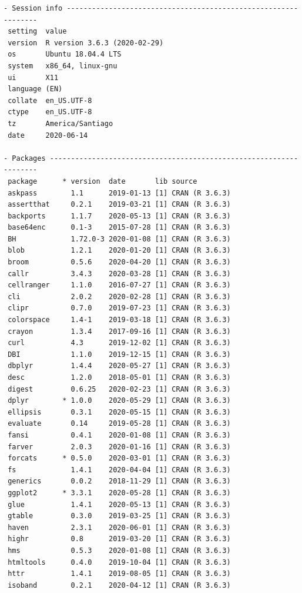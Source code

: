 \documentclass[11pt,oneside]{report}
\begin{document}
\begin{verbatim}
- Session info ---------------------------------------------------------------
 setting  value                       
 version  R version 3.6.3 (2020-02-29)
 os       Ubuntu 18.04.4 LTS          
 system   x86_64, linux-gnu           
 ui       X11                         
 language (EN)                        
 collate  en_US.UTF-8                 
 ctype    en_US.UTF-8                 
 tz       America/Santiago            
 date     2020-06-14                  

- Packages -------------------------------------------------------------------
 package      * version  date       lib source        
 askpass        1.1      2019-01-13 [1] CRAN (R 3.6.3)
 assertthat     0.2.1    2019-03-21 [1] CRAN (R 3.6.3)
 backports      1.1.7    2020-05-13 [1] CRAN (R 3.6.3)
 base64enc      0.1-3    2015-07-28 [1] CRAN (R 3.6.3)
 BH             1.72.0-3 2020-01-08 [1] CRAN (R 3.6.3)
 blob           1.2.1    2020-01-20 [1] CRAN (R 3.6.3)
 broom          0.5.6    2020-04-20 [1] CRAN (R 3.6.3)
 callr          3.4.3    2020-03-28 [1] CRAN (R 3.6.3)
 cellranger     1.1.0    2016-07-27 [1] CRAN (R 3.6.3)
 cli            2.0.2    2020-02-28 [1] CRAN (R 3.6.3)
 clipr          0.7.0    2019-07-23 [1] CRAN (R 3.6.3)
 colorspace     1.4-1    2019-03-18 [1] CRAN (R 3.6.3)
 crayon         1.3.4    2017-09-16 [1] CRAN (R 3.6.3)
 curl           4.3      2019-12-02 [1] CRAN (R 3.6.3)
 DBI            1.1.0    2019-12-15 [1] CRAN (R 3.6.3)
 dbplyr         1.4.4    2020-05-27 [1] CRAN (R 3.6.3)
 desc           1.2.0    2018-05-01 [1] CRAN (R 3.6.3)
 digest         0.6.25   2020-02-23 [1] CRAN (R 3.6.3)
 dplyr        * 1.0.0    2020-05-29 [1] CRAN (R 3.6.3)
 ellipsis       0.3.1    2020-05-15 [1] CRAN (R 3.6.3)
 evaluate       0.14     2019-05-28 [1] CRAN (R 3.6.3)
 fansi          0.4.1    2020-01-08 [1] CRAN (R 3.6.3)
 farver         2.0.3    2020-01-16 [1] CRAN (R 3.6.3)
 forcats      * 0.5.0    2020-03-01 [1] CRAN (R 3.6.3)
 fs             1.4.1    2020-04-04 [1] CRAN (R 3.6.3)
 generics       0.0.2    2018-11-29 [1] CRAN (R 3.6.3)
 ggplot2      * 3.3.1    2020-05-28 [1] CRAN (R 3.6.3)
 glue           1.4.1    2020-05-13 [1] CRAN (R 3.6.3)
 gtable         0.3.0    2019-03-25 [1] CRAN (R 3.6.3)
 haven          2.3.1    2020-06-01 [1] CRAN (R 3.6.3)
 highr          0.8      2019-03-20 [1] CRAN (R 3.6.3)
 hms            0.5.3    2020-01-08 [1] CRAN (R 3.6.3)
 htmltools      0.4.0    2019-10-04 [1] CRAN (R 3.6.3)
 httr           1.4.1    2019-08-05 [1] CRAN (R 3.6.3)
 isoband        0.2.1    2020-04-12 [1] CRAN (R 3.6.3)

\end{verbatim}
\end{document}
